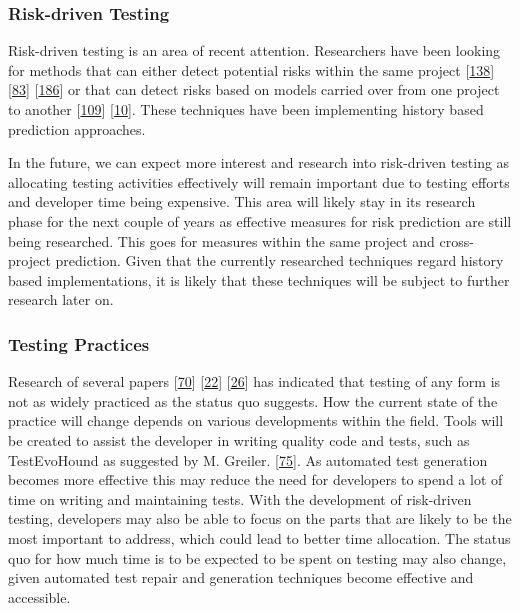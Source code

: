 \documentclass[]{book}
\begin{document}
\subsubsection{Risk-driven Testing}\label{risk-driven-testing-1}

Risk-driven testing is an area of recent attention. Researchers have
been looking for methods that can either detect potential risks within
the same project {[}\protect\hyperlink{ref-noor2015test}{138}{]}
{[}\protect\hyperlink{ref-hemmati2018}{83}{]}
{[}\protect\hyperlink{ref-vernotte2015}{186}{]} or that can detect risks
based on models carried over from one project to another
{[}\protect\hyperlink{ref-leung2015testing}{109}{]}
{[}\protect\hyperlink{ref-atifi2017}{10}{]}. These techniques have been
implementing history based prediction approaches.

In the future, we can expect more interest and research into risk-driven
testing as allocating testing activities effectively will remain
important due to testing efforts and developer time being expensive.
This area will likely stay in its research phase for the next couple of
years as effective measures for risk prediction are still being
researched. This goes for measures within the same project and
cross-project prediction. Given that the currently researched techniques
regard history based implementations, it is likely that these techniques
will be subject to further research later on.

\subsubsection{Testing Practices}\label{testing-practices}

Research of several papers
{[}\protect\hyperlink{ref-GAROUSI20131354}{70}{]}
{[}\protect\hyperlink{ref-beller2017developer}{22}{]}
{[}\protect\hyperlink{ref-beller2015}{26}{]} has indicated that testing
of any form is not as widely practiced as the status quo suggests. How
the current state of the practice will change depends on various
developments within the field. Tools will be created to assist the
developer in writing quality code and tests, such as TestEvoHound as
suggested by M. Greiler. {[}\protect\hyperlink{ref-greiler2013}{75}{]}.
As automated test generation becomes more effective this may reduce the
need for developers to spend a lot of time on writing and maintaining
tests. With the development of risk-driven testing, developers may also
be able to focus on the parts that are likely to be the most important
to address, which could lead to better time allocation. The status quo
for how much time is to be expected to be spent on testing may also
change, given automated test repair and generation techniques become
effective and accessible.
\end{document}
